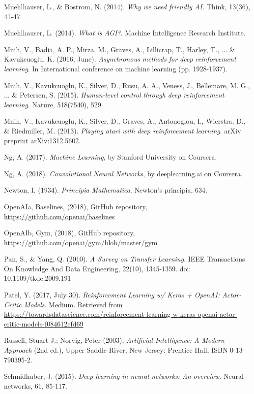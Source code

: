 \begin{thebibliography}{99}
\bibitem{} Muehlhauser, L., \& Bostrom, N. (2014).\textit{ Why we need friendly AI.} Think, 13(36), 41-47.

\bibitem{} Muehlhauser, L. (2014). \textit{What is AGI?}. Machine Intelligence Research Institute. 

\bibitem{} Mnih, V., Badia, A. P., Mirza, M., Graves, A., Lillicrap, T., Harley, T., ... \& Kavukcuoglu, K.
(2016, June). \textit{Asynchronous methods for deep reinforcement learning}. In International conference on machine learning (pp. 1928-1937).

\bibitem{} Mnih, V., Kavukcuoglu, K., Silver, D., Rusu, A. A., Veness, J., Bellemare, M. G., ... \& Petersen, S. (2015). \textit{Human-level control through deep reinforcement learning}. Nature, 518(7540), 529.

\bibitem{} Mnih, V., Kavukcuoglu, K., Silver, D., Graves, A., Antonoglou, I., Wierstra, D., \& Riedmiller,
M. (2013). \textit{Playing atari with deep reinforcement learning}. arXiv preprint arXiv:1312.5602.

\bibitem{} Ng, A. (2017).\textit{ Machine Learning}, by Stanford University on Coursera.

\bibitem{} Ng, A. (2018). \textit{Convolutional Neural Networks}, by deeplearning.ai on Coursera.

\bibitem{} Newton, I. (1934). \textit{Principia Mathematica}. Newton's principia, 634.

\bibitem{} OpenAIa, Baselines, (2018), GitHub repository, \url{https://github.com/openai/baselines}

\bibitem{} OpenAIb, Gym, (2018), GitHub repository, \url{https://github.com/openai/gym/blob/master/gym}

\bibitem{} Pan, S., \& Yang, Q. (2010). \textit{A Survey on Transfer Learning}. IEEE Transactions On Knowledge And Data Engineering, 22(10), 1345-1359. doi: 10.1109/tkde.2009.191

\bibitem{} Patel, Y. (2017, July 30). \textit{Reinforcement Learning w/ Keras + OpenAI: Actor-Critic Models}.
Medium. Retrieved from \url{https://towardsdatascience.com/reinforcement-learning-w-keras-openai-actor-critic-models-f084612cfd69}

\bibitem{} Russell, Stuart J.; Norvig, Peter (2003),\textit{ Artificial Intelligence: A Modern Approach} (2nd ed.), Upper Saddle River, New Jersey: Prentice Hall, ISBN 0-13-790395-2.

\bibitem{} Schmidhuber, J. (2015).\textit{ Deep learning in neural networks: An overview.} Neural networks,
61, 85-117.


\end{thebibliography}
